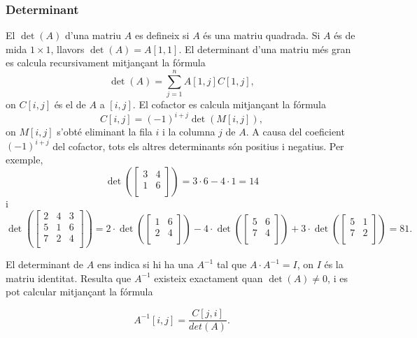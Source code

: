 \subsubsection{Determinant}


El  $\det(A)$ d'una matriu $A$ es defineix si $A$ és
una matriu quadrada. Si $A$ és de mida $1 \times 1$, llavors
$\det(A)=A[1,1]$. El determinant d'una matriu més gran es calcula
recursivament mitjançant la fórmula 
\[\det(A)=\sum_{j=1}^n A[1,j] C[1,j],\]
on $C[i,j]$ és el  de $A$ a $[i,j]$. El cofactor es calcula mitjançant la fórmula
\[C[i,j] = (-1)^{i+j} \det(M[i,j]),\]
on $M[i,j]$ s'obté eliminant la fila $i$ i la columna $j$ de $A$. A
causa del coeficient $(-1)^{i+j}$ del cofactor, tots els altres
determinants són positius i negatius. Per exemple,
\[
\det(
 \begin{bmatrix}
  3 & 4 \\
  1 & 6 \\
 \end{bmatrix}
) = 3 \cdot 6 - 4 \cdot 1 = 14 
\]
i
\[
\det(
 \begin{bmatrix}
  2 & 4 & 3 \\
  5 & 1 & 6 \\
  7 & 2 & 4 \\
 \end{bmatrix}
) = 
2 \cdot
\det(
 \begin{bmatrix}
  1 & 6 \\
  2 & 4 \\
 \end{bmatrix}
)
-4 \cdot
\det(
 \begin{bmatrix}
  5 & 6 \\
  7 & 4 \\
 \end{bmatrix}
)
+3 \cdot
\det(
 \begin{bmatrix}
  5 & 1 \\
  7 & 2 \\
 \end{bmatrix}
) = 81.
\]



El determinant de $A$ ens indica si hi ha una 
$A^{-1}$ tal que $A \cdot A^{-1} = I$, on $I$ és la matriu
identitat. Resulta que $A^{-1}$ existeix exactament quan $\det(A)
\neq 0$, i es pot calcular mitjançant la fórmula


\[A^{-1}[i,j] = \frac{C[j,i]}{det(A)}.\]


